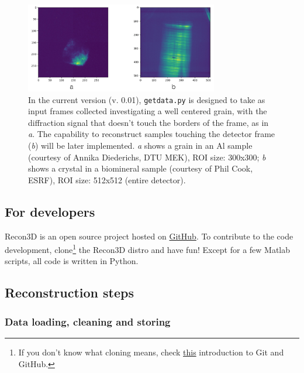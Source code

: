 \documentclass[11pt]{scrartcl}
\begin{document}
\begin{figure}
    \centering
    \includegraphics[width=0.75\textwidth]{centered_not_centered}
    \caption{In the current version (v. 0.01), {\texttt{getdata.py}} is designed to take as input frames collected investigating a well centered grain, with the diffraction signal that doesn't touch the borders of the frame, as in {\emph{a}}. The capability to reconstruct samples touching the detector frame ({\emph{b}}) will be later implemented. {\emph{a}} shows a grain in an Al sample (courtesy of Annika Diederichs, {\footnotesize{DTU MEK}}), {\footnotesize{ROI}} size: 300x300; {\emph{b}} shows a crystal in a biomineral sample (courtesy of Phil Cook, {\footnotesize{ESRF}}), {\footnotesize{ROI}} size: 512x512 (entire detector).}
    \label{fig:centered_not_centered}
\end{figure}

\subsection{For developers}

Recon3D is an open source project hosted on \href{https://github.com/albusdemens/Recon3D}{GitHub}. To contribute to the code development, clone\footnote{If you don't know what cloning means, check \href{http://product.hubspot.com/blog/git-and-github-tutorial-for-beginners}{this} introduction to Git and GitHub.} the Recon3D distro and have fun! Except for a few Matlab scripts, all code is written in Python. 

\subsection{Reconstruction steps}

\subsubsection{Data loading, cleaning and storing}
\end{document}
